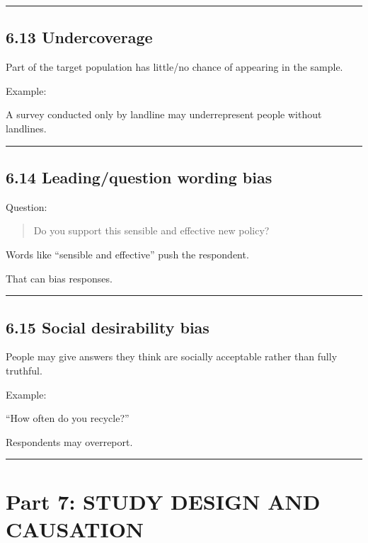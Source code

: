 \documentclass[
]{article}
\begin{document}
\begin{center}\rule{0.5\linewidth}{0.5pt}\end{center}

\subsection{6.13 Undercoverage}\label{undercoverage}

Part of the target population has little/no chance of appearing in the
sample.

Example:

A survey conducted only by landline may underrepresent people without
landlines.

\begin{center}\rule{0.5\linewidth}{0.5pt}\end{center}

\subsection{6.14 Leading/question wording
bias}\label{leadingquestion-wording-bias}

Question:

\begin{quote}
Do you support this sensible and effective new policy?
\end{quote}

Words like ``sensible and effective'' push the respondent.

That can bias responses.

\begin{center}\rule{0.5\linewidth}{0.5pt}\end{center}

\subsection{6.15 Social desirability
bias}\label{social-desirability-bias}

People may give answers they think are socially acceptable rather than
fully truthful.

Example:

``How often do you recycle?''

Respondents may overreport.

\begin{center}\rule{0.5\linewidth}{0.5pt}\end{center}

\section{Part 7: STUDY DESIGN AND
CAUSATION}\label{part-7-study-design-and-causation}
\end{document}
